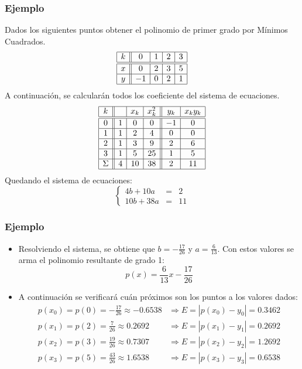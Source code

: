 \documentclass[10pt]{beamer}
\begin{document}
{
\frametitle{Ejemplo}
Dados los siguientes puntos obtener el polinomio de primer grado por M\'inimos Cuadrados.
$$
\begin{array}{|c||c|c|c|c|}\hline
k & 0 & 1 & 2 & 3\\\hline\hline
x & 0 & 2 & 3 & 5\\\hline
y & -1 & 0 & 2 & 1\\\hline
\end{array}
$$
A continuaci\'on, se calcular\'an todos los coeficiente del sistema de ecuaciones.
$$
\begin{array}{|c||c|c|c||c|c|}\hline
  k & & x_k & x_k^2 & y_k & x_ky_k\\\hline\hline
  0 & 1 & 0 & 0 & -1 & 0\\\hline
  1 & 1 & 2 & 4 & 0 & 0\\\hline
  2 & 1 & 3 & 9 & 2 & 6\\\hline
  3 & 1 & 5 & 25 & 1 & 5\\\hline
  \Sigma & 4 & 10 & 38 & 2 & 11\\\hline
\end{array}
$$
Quedando el sistema de ecuaciones:
$$
\left\{\begin{array}{rcl}  
  4b+ 10a & = & 2\\
  10b + 38a & = & 11
\end{array}\right.
$$
}
\begin{frame}
  \frametitle{Ejemplo}
  \begin{itemize}
    \item Resolviendo el sistema, se obtiene que $b = -\frac{17}{26}$ y $a = \frac{6}{13}$. Con estos valores se arma el polinomio resultante de grado 1:
  $$
  p(x) = \frac{6}{13}x - \frac{17}{26}
  $$
  \item<2->A continuación se verificará cuán próximos son los puntos a los valores dados:  
  \begin{align*}
    p(x_0) =p(0) = -\frac{17}{26} \approx -0.6538 & \Rightarrow E = |p(x_0)-y_0|=0.3462\\
    p(x_1) = p(2) = \frac{7}{26} \approx 0.2692& \Rightarrow E = |p(x_1)-y_1|=0.2692\\
    p(x_2) = p(3) = \frac{19}{26} \approx 0.7307& \Rightarrow E = |p(x_2)-y_2|=1.2692\\
    p(x_3) = p(5) = \frac{43}{26} \approx 1.6538& \Rightarrow E = |p(x_3)-y_3|=0.6538
  \end{align*}            
\end{itemize}
\end{frame}
\frame
\end{document}
